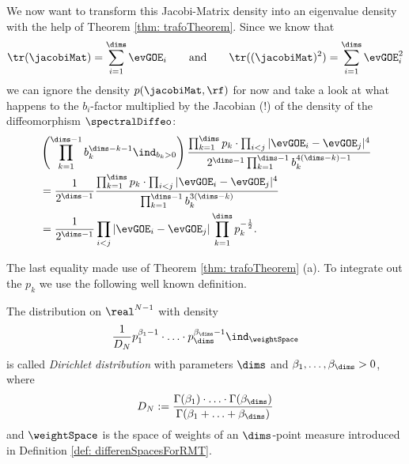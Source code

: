 We now want to transform this Jacobi-Matrix density into an eigenvalue density with the help of Theorem \ref{thm: trafoTheorem}. Since we know that
$$ \tr(\jacobiMat) = \sum_{i=1}^\dims \evGOE_i \qquad \text{and} \qquad \tr((\jacobiMat)^2) = \sum_{i=1}^\dims \evGOE_i^2 $$
we can ignore the density $p(\jacobiMat,\rf)$ for now and take a look at what happens to the $b_i$-factor multiplied by the Jacobian (!) of the density of the diffeomorphism $\spectralDiffeo$:
\begin{align*}
    & \left(\prod_{k=1}^{\dims-1} b_k^{\dims-k-1} \ind_{b_k>0} \right)
    \frac{\prod_{k=1}^\dims p_k \cdot \prod_{i<j} |\evGOE_i - \evGOE_j|^4}{2^{\dims-1} \prod_{k=1}^{\dims-1} b_k^{4(\dims - k)-1}} \\
    & = \frac{1}{2^{\dims-1}}  \frac{\prod_{k=1}^\dims p_k \cdot \prod_{i<j} |\evGOE_i - \evGOE_j|^4}{\prod_{k=1}^{\dims-1} b_k^{3(\dims - k)}} \\
    & = \frac{1}{2^{\dims-1}} \prod_{i<j} |\evGOE_i - \evGOE_j| \prod_{k=1}^\dims p_k^{-\frac{1}{2}}.
\end{align*}

The last equality made use of Theorem \ref{thm: trafoTheorem} (a). To integrate out the $p_k$ we use the following well known definition.

\begin{definition}
    The distribution on $\real^{N-1}$ with density
    \begin{align*}
        \frac{1}{D_N} p_1^{\beta_1 - 1} \cdot \ldots \cdot p_\dims^{\beta_\dims-1} \ind_{\weightSpace}
    \end{align*}
    is called \textit{Dirichlet distribution} with parameters $\dims$ and $\beta_1,\ldots,\beta_\dims > 0$, where
    \begin{align*}
        D_N := \frac{\Gamma(\beta_1)\cdot \ldots \cdot \Gamma(\beta_{\dims})}{\Gamma(\beta_1+\ldots+\beta_\dims)}
    \end{align*}
    and $\weightSpace$ is the space of weights of an $\dims$-point measure introduced in Definition \ref{def: differenSpacesForRMT}.
\end{definition}

